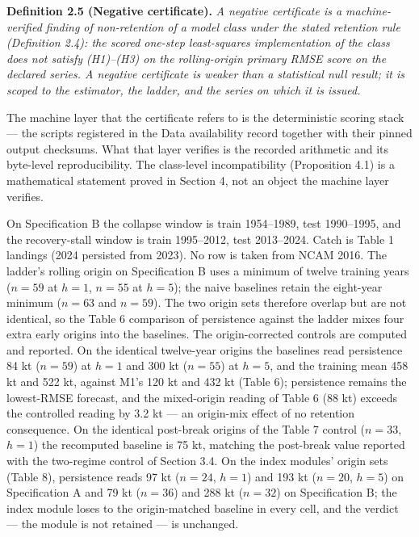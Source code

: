 \documentclass[11pt]{article}
\begin{document}
\textbf{Definition 2.5 (Negative certificate).} \emph{A negative
certificate is a machine-verified finding of non-retention of a model
class under the stated retention rule (Definition 2.4): the scored
one-step least-squares implementation of the class does not satisfy
(H1)--(H3) on the rolling-origin primary RMSE score on the declared
series. A negative certificate is weaker than a statistical null result;
it is scoped to the estimator, the ladder, and the series on which it is
issued.}

The machine layer that the certificate refers to is the deterministic
scoring stack --- the scripts registered in the Data availability record
together with their pinned output checksums. What that layer verifies is
the recorded arithmetic and its byte-level reproducibility. The
class-level incompatibility (Proposition 4.1) is a mathematical
statement proved in Section 4, not an object the machine layer verifies.

On Specification B the collapse window is train 1954--1989, test
1990--1995, and the recovery-stall window is train 1995--2012, test
2013--2024. Catch is Table 1 landings (2024 persisted from 2023). No row
is taken from NCAM 2016. The ladder's rolling origin on Specification B
uses a minimum of twelve training years (\(n=59\) at \(h=1\), \(n=55\)
at \(h=5\)); the naive baselines retain the eight-year minimum (\(n=63\)
and \(n=59\)). The two origin sets therefore overlap but are not
identical, so the Table 6 comparison of persistence against the ladder
mixes four extra early origins into the baselines. The origin-corrected
controls are computed and reported. On the identical twelve-year origins
the baselines read persistence 84 kt (\(n=59\)) at \(h=1\) and 300 kt
(\(n=55\)) at \(h=5\), and the training mean 458 kt and 522 kt, against
M1's 120 kt and 432 kt (Table 6); persistence remains the lowest-RMSE
forecast, and the mixed-origin reading of Table 6 (88 kt) exceeds the
controlled reading by 3.2 kt --- an origin-mix effect of no retention
consequence. On the identical post-break origins of the Table 7 control
(\(n=33\), \(h=1\)) the recomputed baseline is 75 kt, matching the
post-break value reported with the two-regime control of Section 3.4. On
the index modules' origin sets (Table 8), persistence reads 97 kt
(\(n=24\), \(h=1\)) and 193 kt (\(n=20\), \(h=5\)) on Specification A
and 79 kt (\(n=36\)) and 288 kt (\(n=32\)) on Specification B; the index
module loses to the origin-matched baseline in every cell, and the
verdict --- the module is not retained --- is unchanged.
\end{document}

